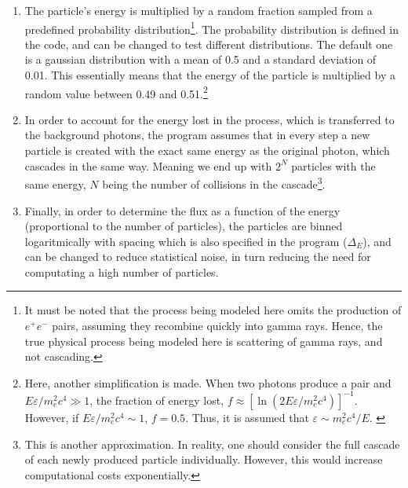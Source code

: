 \begin{enumerate}
\item The particle's energy is multiplied by a random fraction sampled from a predefined probability distribution\footnote{It must be noted that the process being modeled here omits the production of $e^+e^-$ pairs, assuming they recombine quickly into  gamma rays. Hence, the true physical process being modeled here is scattering of gamma rays, and not cascading.}. The probability distribution is defined in the code, and can be changed to test different distributions. The default one is a gaussian distribution with a mean of 0.5 and a standard deviation of 0.01. This essentially means that the energy of the particle is multiplied by a random value between 0.49 and 0.51.\footnote{Here, another simplification is made. When two photons produce a pair and $E\varepsilon/m_e^2c^4\gg1$, the fraction of energy lost, $f\approx [\ln(2E\varepsilon/m_e^2c^4)]^{-1}$. However, if $E\varepsilon/m_e^2c^4\sim 1$, $f=0.5$. Thus, it is assumed that $\varepsilon \sim m_e^2c^4/E$. \citep{energyfraction}}
\item In order to account for the energy lost in the process, which is transferred to the background photons, the program assumes that in every step a new particle is created with the exact same energy as the original photon, which cascades in the same way. Meaning we end up with $2^N$ particles with the same energy, $N$ being the number of collisions in the cascade\footnote{This is another approximation. In reality, one should consider the full cascade of each newly produced particle individually. However, this would increase computational costs exponentially.}.
\item Finally, in order to determine the flux as a function of the energy (proportional to the number of particles), the particles are binned logaritmically with spacing which is also specified in the program ($\Delta_E$), and can be changed to reduce statistical noise, in turn reducing the need for computating a high number of particles.
 
\end{enumerate}





